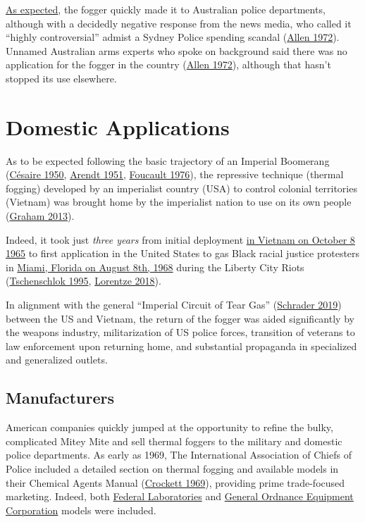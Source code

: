 \documentclass[
  11pt,
]{krantz}
\begin{document}
\protect\hyperlink{TheReturn}{As expected}, the fogger quickly made it to Australian police departments, although with a decidedly negative response from the news media, who called it ``highly controversial'' admist a Sydney Police spending scandal (\protect\hyperlink{ref-Allen1972}{Allen 1972}).
Unnamed Australian arms experts who spoke on background said there was no application for the fogger in the country (\protect\hyperlink{ref-Allen1972}{Allen 1972}), although that hasn't stopped its use elsewhere.

\hypertarget{TheReturn}{%
\chapter{Domestic Applications}\label{TheReturn}}

As to be expected following the basic trajectory of an Imperial Boomerang (\protect\hyperlink{ref-Cesaire1950}{Césaire 1950}, \protect\hyperlink{ref-Arendt1951}{Arendt 1951}, \protect\hyperlink{ref-Foucault1976}{Foucault 1976}), the repressive technique (thermal fogging) developed by an imperialist country (USA) to control colonial territories (Vietnam) was brought home by the imperialist nation to use on its own people (\protect\hyperlink{ref-Graham2013}{Graham 2013}).

Indeed, it took just \emph{three years} from initial deployment \protect\hyperlink{FirstUse}{in Vietnam on October 8 1965} to first application in the United States to gas Black racial justice protesters in \protect\hyperlink{MiamiFL1968_08_08}{Miami, Florida on August 8th, 1968} during the Liberty City Riots (\protect\hyperlink{ref-Tschenschlok1995}{Tschenschlok 1995}, \protect\hyperlink{ref-Lorentzen2018}{Lorentze 2018}).

In alignment with the general ``Imperial Circuit of Tear Gas'' (\protect\hyperlink{ref-Schrader2019}{Schrader 2019}) between the US and Vietnam, the return of the fogger was aided significantly by the weapons industry, militarization of US police forces, transition of veterans to law enforcement upon returning home, and substantial propaganda in specialized and generalized outlets.

\hypertarget{manufacturers}{%
\section{Manufacturers}\label{manufacturers}}

American companies quickly jumped at the opportunity to refine the bulky, complicated Mitey Mite and sell thermal foggers to the military and domestic police departments.
As early as 1969, The International Association of Chiefs of Police included a detailed section on thermal fogging and available models in their Chemical Agents Manual (\protect\hyperlink{ref-Crockett1969}{Crockett 1969}), providing prime trade-focused marketing.
Indeed, both \protect\hyperlink{FederalLaboratories}{Federal Laboratories} and \protect\hyperlink{GOEC}{General Ordnance Equipment Corporation} models were included.
\end{document}
